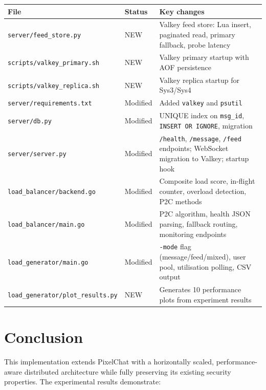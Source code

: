 \documentclass[12pt,a4paper]{article}
\begin{document}
\begin{center}
\begin{tabular}{llp{7cm}}
\toprule
\textbf{File} & \textbf{Status} & \textbf{Key changes} \\
\midrule
\texttt{server/feed\_store.py}           & NEW      & Valkey feed store: Lua insert, paginated read, primary fallback, probe latency \\
\texttt{scripts/valkey\_primary.sh}      & NEW      & Valkey primary startup with AOF persistence \\
\texttt{scripts/valkey\_replica.sh}      & NEW      & Valkey replica startup for Sys3/Sys4 \\
\texttt{server/requirements.txt}         & Modified & Added \texttt{valkey} and \texttt{psutil} \\
\texttt{server/db.py}                    & Modified & UNIQUE index on \texttt{msg\_id}, \texttt{INSERT OR IGNORE}, migration \\
\texttt{server/server.py}                & Modified & \texttt{/health}, \texttt{/message}, \texttt{/feed} endpoints; WebSocket migration to Valkey; startup hook \\
\texttt{load\_balancer/backend.go}       & Modified & Composite load score, in-flight counter, overload detection, P2C methods \\
\texttt{load\_balancer/main.go}          & Modified & P2C algorithm, health JSON parsing, fallback routing, monitoring endpoints \\
\texttt{load\_generator/main.go}         & Modified & \texttt{-mode} flag (message/feed/mixed), user pool, utilisation polling, CSV output \\
\texttt{load\_generator/plot\_results.py}& NEW      & Generates 10 performance plots from experiment results \\
\bottomrule
\end{tabular}
\end{center}

\section{Conclusion}

This implementation extends PixelChat with a horizontally scaled, performance-aware distributed architecture while fully preserving its existing security properties. The experimental results demonstrate:
\end{document}
